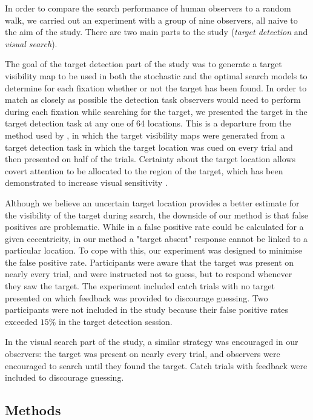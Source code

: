 \documentclass[preprint, authoryear]{elsarticle} %
\begin{document}
In order to compare the search performance of human observers to a random walk, we carried out an experiment with a group of nine observers, all naive to the aim of the study. There are two main parts to the study (\textit{target detection} and \textit{visual search}). 
\par
The goal of the target detection part of the study was to generate a target visibility map to be used in both the stochastic and the optimal search models to determine for each fixation whether or not the target has been found. In order to match as closely as possible the detection task observers would need to perform during each fixation while searching for the target, we presented the target in the target detection task at any one of 64 locations. This is a departure from the method used by \cite{najemnik-geisler2005, najemnik-geisler2008}, in which the target visibility maps were generated from a target detection task in which the target location was cued on every trial and then presented on half of the trials. Certainty about the target location allows covert attention to be allocated to the region of the target, which has been demonstrated to increase visual sensitivity \citep{yeshurun1998}. 
\par
Although we believe an uncertain target location provides a better estimate for the visibility of the target during search, the downside of our method is that false positives are problematic. While in \cite{najemnik-geisler2005,najemnik-geisler2008} a false positive rate could be calculated for a given eccentricity, in our method a "target absent" response cannot be linked to a particular location. To cope with this, our experiment was designed to minimise the false positive rate. Participants were aware that the target was present on nearly every trial, and were instructed not to guess, but to respond whenever they saw the target. The experiment included catch trials with no target presented on which feedback was provided to discourage guessing. Two participants were not included in the study because their false positive rates exceeded $15\%$ in the target detection session.
\par
In the visual search part of the study, a similar strategy was encouraged in our observers: the target was present on nearly every trial, and observers were encouraged to search until they found the target. Catch trials with feedback were included to discourage guessing.

\subsection{Methods}
\end{document}
